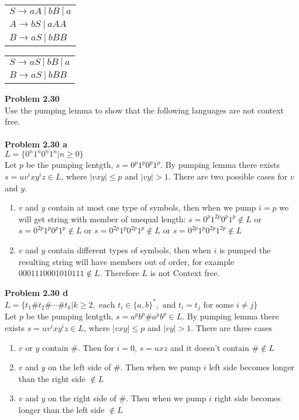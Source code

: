 \documentclass{article}
\newcommand{\problem}[1]{\large{\textbf{Problem #1} \\}}
\begin{document}
\begin{table}[h!]
\centering
\begin{tabular}{l}
$S \rightarrow a A\: | \:b B \:|\: a $\\
$A \rightarrow b S \:| \:a AA $ \\
$B \rightarrow a S \:| \:b BB $ \\
\end{tabular}
\end{table}

\begin{table}[h!]
\centering
\begin{tabular}{l}
$S \rightarrow a S\: | \:b B \:|\: a $\\
$B \rightarrow a S \:| \:b BB $ \\
\end{tabular}
\end{table}

\problem{2.30}
Use the pumping lemma to show that the following languages are not context free. \\ \\
\problem{2.30 a}
$L = \{ 0^n 1^n 0^n 1^n | n \geq 0  \}$ \\

Let $p$ be the pumping lentgth, $s = 0^p 1^p 0^p 1^p$. By pumping lemma 
there exists $s = uv^ixy^iz \in L$, where $|vxy| \leq p$ and $|vy| > 1$. There are two 
possible cases for $v$ and $y$.
\begin{enumerate}[Case 1., leftmargin = 1.5cm]
\itemsep0em
\item $v$ and $y$ contain at most one type of symbols, then when
we pump $i = p$ we will get string with member of unequal length:
 $s = 0^p 1^{2p} 0^p 1^p \notin L$ or $s = 0^{2p} 1^p 0^p 1^p \notin L$ or $s = 0^{2p} 1^p 0^{2p} 1^p \notin L$ or 
$s = 0^{2p} 1^p 0^{2p} 1^{2p} \notin L$
\item $v$ and $y$ contain different types of symbols, then when $i$ is pumped the resulting 
string will have members out of order, for example $0001110001010111 \notin L$. Therefore $L$ is not Context free.
\end{enumerate}

\vspace{0.2cm}
\problem{2.30 d}
$L = \{ t_1 \# t_2 \# \cdots \# t_k | k \geq 2,\text{ each } t_i \in \{a,b\}^*,\text{ and }t_i = t_j\text{ for some } i \neq j  \}$  \\

Let $p$ be the pumping lentgth, $s = a^p b ^p \# a^p b^p \in L$. By pumping lemma 
there exists $s = uv^ixy^iz \in L$, where $|vxy| \leq p$ and $|vy| > 1$. There are three
cases
\begin{enumerate}[Case 1., leftmargin = 1.5cm]
\itemsep0em
\item $v$ or $y$ contain $\#$. Then for $i = 0$, $s = uxz$ and it doesn't contain $\# \notin L$
\item $v$ and $y$ on the left side of $\#$. Then when we pump $i$ left side becomes longer than the right side $\notin L$
\item $v$ and $y$ on the right side of $\#$. Then when we pump $i$ right side becomes longer than the left side $\notin L$
\end{enumerate}
\end{document}
